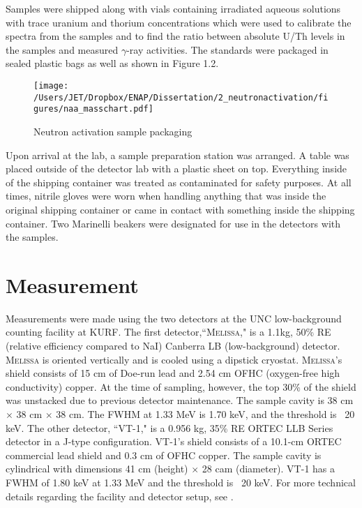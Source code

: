 Samples were shipped along with vials containing irradiated aqueous solutions with trace uranium and thorium concentrations which were used to calibrate the spectra from the samples and to find the ratio between absolute U/Th levels in the samples and measured $\gamma$-ray activities.  The standards were packaged in sealed plastic bags as well as shown in Figure 1.2.

\begin{figure}[htbp]
\centering
\texttt{[image: /Users/JET/Dropbox/ENAP/Dissertation/2\_neutronactivation/figures/naa\_masschart.pdf]}
\caption[%
Neutron activation sample packaging
]{%
Neutron activation sample packaging
\label{fig:mjd_cryostat}} 
\end{figure}

Upon arrival at the lab, a sample preparation station was arranged.  A table was placed outside of the detector lab with a plastic sheet on top.  Everything inside of the shipping container was treated as contaminated for safety purposes.  At all times, nitrile gloves were worn when handling anything that was inside the original shipping container or came in contact with something inside the shipping container.  Two Marinelli beakers were designated for use in the detectors with the samples.


\section{Measurement}

Measurements were made using the two detectors at the UNC low-background counting facility at KURF.  The first detector,``\textsc{Melissa}," is a 1.1kg, 50\% RE (relative efficiency compared to NaI) Canberra LB (low-background) detector. \textsc{Melissa} is oriented vertically and is cooled using a dipstick cryostat. \textsc{Melissa}'s shield consists of 15 cm of Doe-run lead and 2.54 cm OFHC (oxygen-free high conductivity) copper. At the time of sampling, however, the top 30\% of the shield was unstacked due to previous detector maintenance.  The sample cavity is 38 cm $\times$ 38 cm $\times$ 38 cm.  The FWHM at 1.33 MeV is 1.70 keV, and the threshold is ~20 keV.   The other detector, ``VT-1," is a 0.956 kg, 35\% RE ORTEC LLB Series detector in a J-type configuration. VT-1's shield consists of a 10.1-cm ORTEC commercial lead shield and 0.3 cm of OFHC copper. The sample cavity  is cylindrical with dimensions 41 cm (height) $\times$ 28 cam (diameter).  VT-1 has a FWHM of 1.80 keV at 1.33 MeV and the threshold is ~20 keV. For more technical details regarding the facility and detector setup, see \cite{Fin10}.

